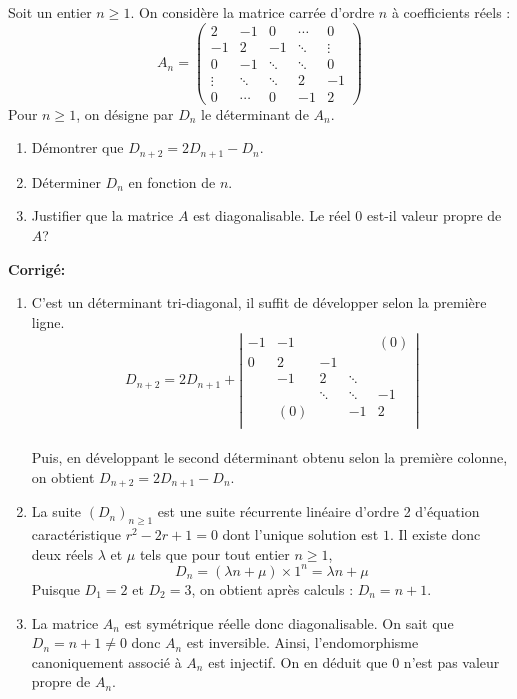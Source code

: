 \documentclass[a4paper,twoside,french,11pt]{VcCours}
\newcommand{\corr}{\textbf{Corrigé:}}
\begin{document}
\begin{Exercice}{} Soit un entier $n\geq 1.$ On considère la matrice carr\'{e}e d'ordre $n$ \`{a} coefficients r\'{e}els :
\begin{equation*}
A_n=\begin{pmatrix}
2 & -1 & 0 & \cdots & 0 \\ 
-1 & 2 & -1 & \ddots & \vdots \\ 
0 & -1 & \ddots & \ddots & 0 \\ 
\vdots & \ddots & \ddots & 2 & -1 \\ 
0 & \cdots & 0 & -1 & 2
\end{pmatrix}
\end{equation*}
Pour $n\geq 1$, on d\'{e}signe par $D_{n}$ le d\'{e}terminant de $A_n$.
\begin{enumerate}
\item Démontrer que $D_{n+2}=2D_{n+1}-D_{n}$.
\item D\'{e}terminer $D_{n}$ en fonction de $n$.
\item Justifier que la matrice $A$ est diagonalisable. Le r\'{e}el $0$ est-il valeur propre de $A$?
\end{enumerate}
\end{Exercice}

\newpage

\corr \begin{enumerate}
\item
 C'est un déterminant tri-diagonal, il suffit de développer selon la première ligne.
$$D_{n+2}  = 2D_{n +1}  + \left| {
\begin{array}{lllll}
 { - 1} & { - 1} & {} & {} & {(0)}  \\
 0 & 2 & { - 1} & {} & {}  \\
 {} & { - 1} & 2 &  \ddots  & {}  \\
 {} & {} &  \ddots  &  \ddots  & { - 1}  \\
 {} & {(0)} & {} & { - 1} & 2  \\
\end{array}
} \right|$$\\
Puis, en développant le second déterminant obtenu selon la première colonne, on obtient $D_{n+2}=2D_{n+1}-D_n$.
\item
La suite $(D_n)_{n \geq 1}$ est une suite récurrente linéaire d'ordre 2 d'équation caractéristique $r^2  - 2r + 1 = 0$ dont l'unique solution est $1$. Il existe donc deux réels $\lambda$ et $\mu$ tels que pour tout entier $n \geq 1$,
$$D_n  = (\lambda n + \mu ) \times 1^n= \lambda n + \mu$$
Puisque $D_1  = 2$ et $D_2  = 3$, on obtient après calculs :
$D_n  = n + 1$.
\item La matrice $A_n$ est symétrique réelle donc diagonalisable. 
On sait que $D_n=n+1\neq 0$ donc $A_n$ est inversible. Ainsi, l'endomorphisme canoniquement associé à $A_n$ est injectif.
On en déduit que $0$ n'est pas valeur propre de $A_n$.
\end{enumerate}
\end{document}
